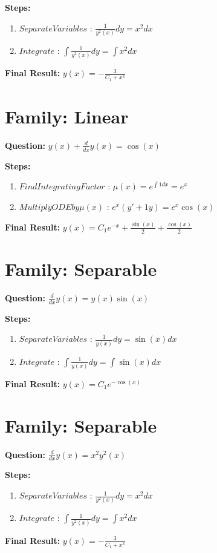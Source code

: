 \documentclass{article}
\begin{document}
\textbf{Steps:}
\begin{enumerate}
\item $Separate Variables$ :  $\frac{1}{y^{2}{\left(x \right)}} dy = x^{2} dx$
\item $Integrate$ :  $\int \frac{1}{y^{2}{\left(x \right)}} dy = \int x^{2} dx$
\end{enumerate}
\textbf{Final Result:} $y{\left(x \right)} = - \frac{3}{C_{1} + x^{3}}$

\section*{Family: Linear}
\textbf{Question:} $y{\left(x \right)} + \frac{d}{d x} y{\left(x \right)} = \cos{\left(x \right)}$

\textbf{Steps:}
\begin{enumerate}
\item $Find Integrating Factor$ :  $\mu(x) = e^{\int 1 dx} = e^{x}$
\item $Multiply ODE by \mu(x)$ :  $e^{x}(y' + 1y) = e^{x} \cos{\left(x \right)}$
\end{enumerate}
\textbf{Final Result:} $y{\left(x \right)} = C_{1} e^{- x} + \frac{\sin{\left(x \right)}}{2} + \frac{\cos{\left(x \right)}}{2}$

\section*{Family: Separable}
\textbf{Question:} $\frac{d}{d x} y{\left(x \right)} = y{\left(x \right)} \sin{\left(x \right)}$

\textbf{Steps:}
\begin{enumerate}
\item $Separate Variables$ :  $\frac{1}{y{\left(x \right)}} dy = \sin{\left(x \right)} dx$
\item $Integrate$ :  $\int \frac{1}{y{\left(x \right)}} dy = \int \sin{\left(x \right)} dx$
\end{enumerate}
\textbf{Final Result:} $y{\left(x \right)} = C_{1} e^{- \cos{\left(x \right)}}$

\section*{Family: Separable}
\textbf{Question:} $\frac{d}{d x} y{\left(x \right)} = x^{2} y^{2}{\left(x \right)}$

\textbf{Steps:}
\begin{enumerate}
\item $Separate Variables$ :  $\frac{1}{y^{2}{\left(x \right)}} dy = x^{2} dx$
\item $Integrate$ :  $\int \frac{1}{y^{2}{\left(x \right)}} dy = \int x^{2} dx$
\end{enumerate}
\textbf{Final Result:} $y{\left(x \right)} = - \frac{3}{C_{1} + x^{3}}$
\end{document}
